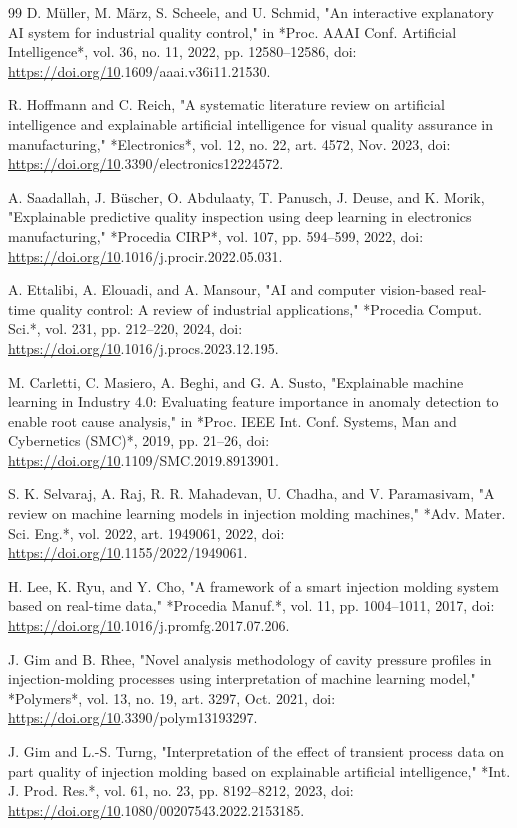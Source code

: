 \begin{thebibliography}{99}
 D. Müller, M. März, S. Scheele, and U. Schmid, "An interactive explanatory AI system for industrial quality control," in *Proc. AAAI Conf. Artificial Intelligence*, vol. 36, no. 11, 2022, pp. 12580–12586, doi: \url{https://doi.org/10}.1609/aaai.v36i11.21530.

 R. Hoffmann and C. Reich, "A systematic literature review on artificial intelligence and explainable artificial intelligence for visual quality assurance in manufacturing," *Electronics*, vol. 12, no. 22, art. 4572, Nov. 2023, doi: \url{https://doi.org/10}.3390/electronics12224572.

 A. Saadallah, J. Büscher, O. Abdulaaty, T. Panusch, J. Deuse, and K. Morik, "Explainable predictive quality inspection using deep learning in electronics manufacturing," *Procedia CIRP*, vol. 107, pp. 594–599, 2022, doi: \url{https://doi.org/10}.1016/j.procir.2022.05.031.

 A. Ettalibi, A. Elouadi, and A. Mansour, "AI and computer vision-based real-time quality control: A review of industrial applications," *Procedia Comput. Sci.*, vol. 231, pp. 212–220, 2024, doi: \url{https://doi.org/10}.1016/j.procs.2023.12.195.

 M. Carletti, C. Masiero, A. Beghi, and G. A. Susto, "Explainable machine learning in Industry 4.0: Evaluating feature importance in anomaly detection to enable root cause analysis," in *Proc. IEEE Int. Conf. Systems, Man and Cybernetics (SMC)*, 2019, pp. 21–26, doi: \url{https://doi.org/10}.1109/SMC.2019.8913901.

 S. K. Selvaraj, A. Raj, R. R. Mahadevan, U. Chadha, and V. Paramasivam, "A review on machine learning models in injection molding machines," *Adv. Mater. Sci. Eng.*, vol. 2022, art. 1949061, 2022, doi: \url{https://doi.org/10}.1155/2022/1949061.

 H. Lee, K. Ryu, and Y. Cho, "A framework of a smart injection molding system based on real-time data," *Procedia Manuf.*, vol. 11, pp. 1004–1011, 2017, doi: \url{https://doi.org/10}.1016/j.promfg.2017.07.206.

 J. Gim and B. Rhee, "Novel analysis methodology of cavity pressure profiles in injection-molding processes using interpretation of machine learning model," *Polymers*, vol. 13, no. 19, art. 3297, Oct. 2021, doi: \url{https://doi.org/10}.3390/polym13193297.

 J. Gim and L.-S. Turng, "Interpretation of the effect of transient process data on part quality of injection molding based on explainable artificial intelligence," *Int. J. Prod. Res.*, vol. 61, no. 23, pp. 8192–8212, 2023, doi: \url{https://doi.org/10}.1080/00207543.2022.2153185.


\end{thebibliography}
